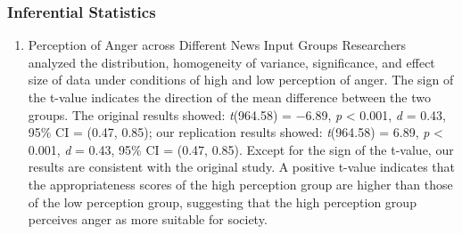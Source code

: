 \documentclass[
  man]{apa6}
\providecommand{\tightlist}{%
  \setlength{\itemsep}{0pt}\setlength{\parskip}{0pt}}
\begin{document}
\hypertarget{inferential-statistics-4}{%
\subsubsection{Inferential Statistics}\label{inferential-statistics-4}}

\begin{enumerate}
\def\labelenumi{\arabic{enumi}.}
\tightlist
\item
  Perception of Anger across Different News Input Groups
  Researchers analyzed the distribution, homogeneity of variance, significance, and effect size of data under conditions of high and low perception of anger. The sign of the t-value indicates the direction of the mean difference between the two groups. The original results showed: \emph{t}(964.58) = −6.89, \emph{p} \textless{} 0.001, \emph{d} = 0.43, 95\% CI = (0.47, 0.85); our replication results showed: \emph{t}(964.58) = 6.89, \emph{p} \textless{} 0.001, \emph{d} = 0.43, 95\% CI = (0.47, 0.85). Except for the sign of the t-value, our results are consistent with the original study. A positive t-value indicates that the appropriateness scores of the high perception group are higher than those of the low perception group, suggesting that the high perception group perceives anger as more suitable for society.


\end{enumerate}
\end{document}

